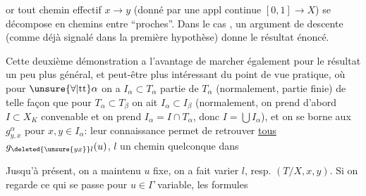 or tout chemin effectif $x\longrightarrow y$ (donné par une appl continue $[0,1]\longrightarrow X$) se décompose en  chemins 
entre   ``proches''. Dans le cas ,  un argument de descente (comme déjà signalé dans la première hypothèse) donne le résultat énoncé.

Cette deuxième démonstration a l'avantage de marcher également pour  le résultat un peu plus général, et peut-être plus intéressant du point de vue pratique, où pour $\unsure{\forall|\text{tt}}\alpha$ on a $I_\alpha\subset T_\alpha$ partie  de $T_\alpha$ (normalement, partie finie) de telle façon que pour $T_\alpha\subset T_\beta$ on ait $I_\alpha\subset I_\beta$ (normalement, on prend d'abord $I\subset X_K$ convenable et on prend $I_\alpha=I\cap T_\alpha$, donc $I=\bigcup I_\alpha$), et on se borne aux $g^\alpha_{y,x}$ pour $x,y\in I_\alpha$: leur connaissance permet de retrouver \uline{tous}  $g_{\deleted{\unsure{yx}}l}(u)$, $l$ un chemin quelconque dans


Jusqu'à présent, on a maintenu $u$ fixe, on a fait varier $l$, resp. $(T/X,x,y)$. Si on regarde ce qui se passe pour $u\in\Gamma$ variable, les formules
